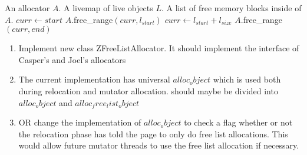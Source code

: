 \begin{algorithm}
    \caption{$(A,L)$}
    \begin{algorithmic}[1]
    \Require An allocator $A$. A livemap of live objects $L$.
    \Ensure A list of free memory blocks inside of $A$.
    \State $curr\gets start$ 
            \State $A$.free\_range$(curr, l_{start})$ 
        \EndIf
        \State $curr\gets l_{start} + l_{size}$ 
    \EndFor
    \State $A$.free\_range$(curr,end)$ 
    \end{algorithmic}
    \label{alg:init}
\end{algorithm}

\begin{enumerate}
    \item Implement new class ZFreeListAllocator. It should implement the interface of Casper's and Joel's allocators
    
    \item The current implementation has universal $alloc_object$ which is used both during relocation and mutator allocation. should maybe be divided into $alloc_object$ and $alloc_free_list_object$
    
    \item OR change the implementation of $alloc_object$ to check a flag whether or not the relocation phase has told the page to only do free list allocations. This would allow future mutator threads to use the free list allocation if necessary. 
\end{enumerate}

